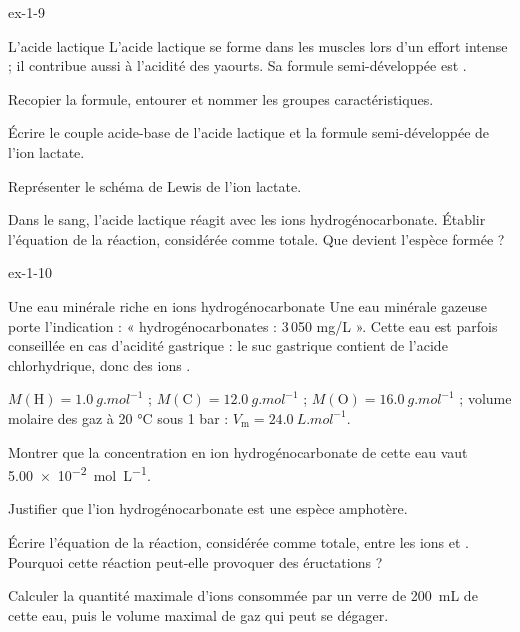 \begin{blocLivre}{ex-1-9}
\begin{exercice}[2]{L'acide lactique}
L'acide lactique se forme dans les muscles lors d'un effort intense ; il contribue aussi à
l'acidité des yaourts. Sa formule semi-développée est .
\begin{questions}
\item Recopier la formule, entourer et nommer les groupes caractéristiques.
\item Écrire le couple acide-base de l'acide lactique et la formule semi-développée de l'ion lactate.
\item Représenter le schéma de Lewis de l'ion lactate.
\item Dans le sang, l'acide lactique réagit avec les ions hydrogénocarbonate. Établir l'équation
de la réaction, considérée comme totale. Que devient l'espèce  formée ?
\end{questions}
\end{exercice}
\end{blocLivre}
\begin{blocLivre}{ex-1-10}
\begin{exercice}[2]{Une eau minérale riche en ions hydrogénocarbonate}
Une eau minérale gazeuse porte l'indication : « hydrogénocarbonates  : 3\,050 mg/L ».
Cette eau est parfois conseillée en cas d'acidité gastrique : le suc gastrique contient de l'acide
chlorhydrique, donc des ions .
\begin{donnees}
$M(\mathrm{H})=\qty{1,0}{g.mol^{-1}}$ ; $M(\mathrm{C})=\qty{12,0}{g.mol^{-1}}$ ; $M(\mathrm{O})=\qty{16,0}{g.mol^{-1}}$ ;
volume molaire des gaz à 20 °C sous 1 bar : $V_\mathrm{m}=\qty{24,0}{L.mol^{-1}}$.
\end{donnees}
\begin{questions}
\item Montrer que la concentration en ion hydrogénocarbonate de cette eau vaut \qty{5,00e-2}{mol.L^{-1}}.
\item Justifier que l'ion hydrogénocarbonate est une espèce amphotère.
\item Écrire l'équation de la réaction, considérée comme totale, entre les ions  et .
Pourquoi cette réaction peut-elle provoquer des éructations ?
\item Calculer la quantité maximale d'ions  consommée par un verre de \qty{200}{mL} de cette eau,
puis le volume maximal de gaz qui peut se dégager.
\end{questions}
\end{exercice}
\end{blocLivre}
